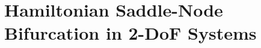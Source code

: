 \documentclass[8pt]{article}
\begin{document}



\section{Hamiltonian Saddle-Node Bifurcation in 2-DoF Systems}
\end{document}
